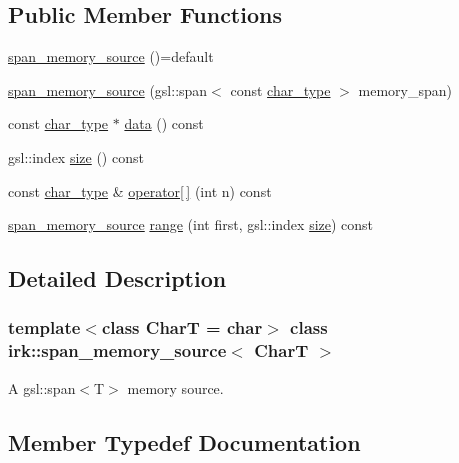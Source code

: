 \subsection*{Public Member Functions}
\begin{DoxyCompactItemize}
\item 
\mbox{\hyperlink{classirk_1_1span__memory__source_a39cae60a3e106cb9cb977b46e540c8b3}{span\+\_\+memory\+\_\+source}} ()=default
\item 
\mbox{\hyperlink{classirk_1_1span__memory__source_a4de152530448b9a46951d99320333ca9}{span\+\_\+memory\+\_\+source}} (gsl\+::span$<$ const \mbox{\hyperlink{classirk_1_1span__memory__source_a769d88b11f7c2882a006e93edb2cdb79}{char\+\_\+type}} $>$ memory\+\_\+span)
\item 
const \mbox{\hyperlink{classirk_1_1span__memory__source_a769d88b11f7c2882a006e93edb2cdb79}{char\+\_\+type}} $\ast$ \mbox{\hyperlink{classirk_1_1span__memory__source_a117f7439cc35e16c02b3656104020ad3}{data}} () const
\item 
gsl\+::index \mbox{\hyperlink{classirk_1_1span__memory__source_a91975691d661bddcd60f8f57c6275297}{size}} () const
\item 
const \mbox{\hyperlink{classirk_1_1span__memory__source_a769d88b11f7c2882a006e93edb2cdb79}{char\+\_\+type}} \& \mbox{\hyperlink{classirk_1_1span__memory__source_a6edbac0e4fd45be9f2d651d3bfa431a1}{operator\mbox{[}$\,$\mbox{]}}} (int n) const
\item 
\mbox{\hyperlink{classirk_1_1span__memory__source}{span\+\_\+memory\+\_\+source}} \mbox{\hyperlink{classirk_1_1span__memory__source_a26a51966eb90329da22ef03066787f58}{range}} (int first, gsl\+::index \mbox{\hyperlink{classirk_1_1span__memory__source_a91975691d661bddcd60f8f57c6275297}{size}}) const
\end{DoxyCompactItemize}


\subsection{Detailed Description}
\subsubsection*{template$<$class CharT = char$>$\newline
class irk\+::span\+\_\+memory\+\_\+source$<$ Char\+T $>$}

A gsl\+::span$<$\+T$>$ memory source. 

\subsection{Member Typedef Documentation}
\mbox{\label{classirk_1_1span__memory__source_a769d88b11f7c2882a006e93edb2cdb79}} 
